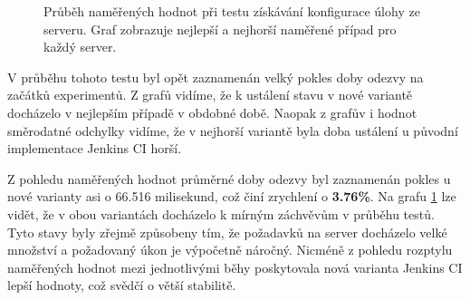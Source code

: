             \begin{figure}[h!t]
             \begin{adjustwidth}{-0.5cm}{}
                \begin{center}
                    \caption{Průběh naměřených hodnot při testu získávání konfigurace úlohy ze serveru.
                        Graf zobrazuje nejlepší a nejhorší naměřené případ pro každý server.}
                    \label{imgGetFreestyleCast}
                \end{center}
             \end{adjustwidth}
            \end{figure}

            V průběhu tohoto testu byl opět zaznamenán velký pokles doby odezvy na začátků experimentů.
            Z grafů vidíme, že k ustálení stavu v nové variantě docházelo v nejlepším případě v obdobné době.
            Naopak z grafův i hodnot směrodatné odchylky vidíme,
            že v nejhorší variantě byla doba ustálení u původní implementace Jenkins CI horší.

            Z pohledu naměřených hodnot průměrné doby odezvy byl zaznamenán pokles
            u nové varianty asi o 66.516 milisekund, což činí zrychlení o \textbf{3.76\%}.
            Na grafu \ref{imgGetFreestyleCast} lze vidět, že v obou variantách 
            docházelo k mírným záchvěvům v průběhu testů. Tyto stavy byly zřejmě 
            způsobeny tím, že požadavků na server docházelo velké množství
            a požadovaný úkon je výpočetně náročný. 
            Nicméně z pohledu rozptylu naměřených hodnot mezi jednotlivými
            běhy poskytovala nová varianta Jenkins CI lepší hodnoty,
            což svědčí o větší stabilitě.


